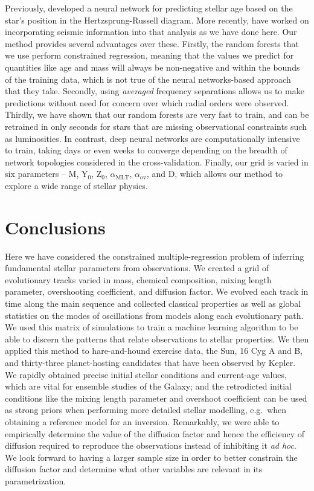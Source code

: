 \documentclass[iop,apj,twocolappendix]{emulateapj}
\begin{document}
Previously, \citet{pulone1997age} developed a neural network for predicting stellar age based on the star's position in the Hertzsprung-Russell diagram. More recently, \citet{2016arXiv160200902V} have worked on incorporating seismic information into that analysis as we have done here. Our method provides several advantages over these. Firstly, the random forests that we use perform constrained regression, meaning that the values we predict for quantities like age and mass will always be non-negative and within the bounds of the training data, which is not true of the neural networks-based approach that they take. Secondly, using \emph{averaged} frequency separations allows us to make predictions without need for concern over which radial orders were observed. Thirdly, we have shown that our random forests are very fast to train, and can be retrained in only seconds for stars that are missing observational constraints such as luminosities. In contrast, deep neural networks are computationally intensive to train, taking days or even weeks to converge depending on the breadth of network topologies considered in the cross-validation. Finally, our grid is varied in six parameters -- M, Y$_0$, Z$_0$, $\alpha_{\text{MLT}}$, $\alpha_{\text{ov}}$, and D, which allows our method to explore a wide range of stellar physics.


\section{Conclusions}
Here we have considered the constrained multiple-regression problem of inferring fundamental stellar parameters from observations. We created a grid of evolutionary tracks varied in mass, chemical composition, mixing length parameter, overshooting coefficient, and diffusion factor. We evolved each track in time along the main sequence and collected classical properties as well as global statistics on the modes of oscillations from models along each evolutionary path. We used this matrix of simulations to train a machine learning algorithm to be able to discern the patterns that relate observations to stellar properties. We then applied this method to hare-and-hound exercise data, the Sun, 16 Cyg A and B, and thirty-three planet-hosting candidates that have been observed by Kepler. We rapidly obtained precise initial stellar conditions and current-age values, which are vital for ensemble studies of the Galaxy; and the retrodicted initial conditions like the mixing length parameter and overshoot coefficient can be used as strong priors when performing more detailed stellar modelling, e.g.\ when obtaining a reference model for an inversion. Remarkably, we were able to empirically determine the value of the diffusion factor and hence the efficiency of diffusion required to reproduce the observations instead of inhibiting it \emph{ad hoc}. We look forward to having a larger sample size in order to better constrain the diffusion factor and determine what other variables are relevant in its parametrization. 
\end{document}
